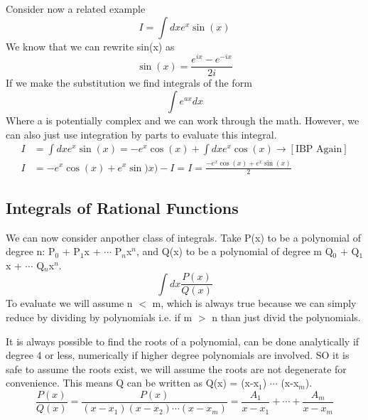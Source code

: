 \documentclass{article}
\newcommand{\be}{\begin{equation}}
\newcommand{\ee}{\end{equation}}
\begin{document}
Consider now a related example
\be
I = \int dx e^x \sin(x) 
\ee
We know that we can rewrite sin(x) as 
\be
\sin(x) = \frac{e^{ix}-e^{-ix}}{2i}
\ee
If we make the substitution we find integrals of the form
\be
\int e^{ax} dx
\ee
Where a is potentially complex and we can work through the math.
However, we can also just use integration by parts to evaluate this integral. 
\be
\begin{split}
	I &= \int dx e^x \sin(x) = -e^x \cos(x) + \int dx e^x \cos(x) \rightarrow[\text{IBP Again}]\\
	I &= -e^x \cos(x) + e^x \sin)x) - I = I = \frac{-e^x \cos(x) + e^x \sin(x)}{2}
\end{split}
\ee

\subsection*{Integrals of Rational Functions}
We can now consider anpother class of integrals.
Take P(x) to be a polynomial of degree n: P$_0$ + P$_1$x + $\cdots$ P$_n$x$^n$, and Q(x) to be a polynomial of degree m  Q$_0$ + Q$_1$x + $\cdots$ Q$_n$x$^n$.
\be
\int dx \frac{P(x)}{Q(x)}
\ee
To evaluate we will assume n $<$ m, which is always true because we can simply reduce by dividing by polynomials i.e. if m $>$ n than just divid the polynomials.

It is always possible to find the roots of a polynomial, can be done analytically if degree 4 or less, numerically if higher degree polynomials are involved. 
SO it is safe to assume the roots exist, we will assume the roots are not degenerate for convenience. 
This means Q can be written as Q(x) = (x-x$_1$) $\cdots$ (x-x$_m$).
\be
\frac{P(x)}{Q(x)} = \frac{P(x)}{(x-x_1)(x-x_2)\cdots(x-x_m)} = \frac{A_1}{x-x_1} + \cdots + \frac{A_m}{x-x_m}
\ee
\end{document}
